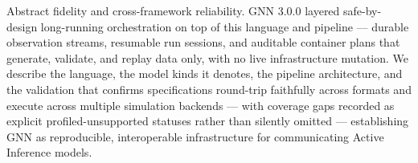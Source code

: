 \documentclass[
  ignorenonframetext,
]{beamer}
\begin{document}
\begin{frame}{Abstract}
fidelity and cross-framework reliability. GNN 3.0.0 layered
safe-by-design long-running orchestration on top of this language and
pipeline --- durable observation streams, resumable run sessions, and
auditable container plans that generate, validate, and replay data only,
with no live infrastructure mutation. We describe the language, the
model kinds it denotes, the pipeline architecture, and the validation
that confirms specifications round-trip faithfully across formats and
execute across multiple simulation backends --- with coverage gaps
recorded as explicit profiled-unsupported statuses rather than silently
omitted --- establishing GNN as reproducible, interoperable
infrastructure for communicating Active Inference models.
\end{frame}
\end{document}
